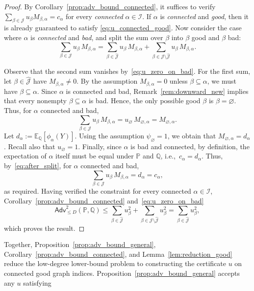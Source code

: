 \documentclass[11pt, letterpaper]{article}
\numberwithin{equation}{section}
\newcommand{\Adv}{\mathsf{Adv}}
\newcommand{\cJ}{\mathcal{J}}
\newcommand{\E}{\mathbb{E}}
\newcommand{\PP}{\mathbb{P}}
\newcommand{\QQ}{\mathbb{Q}}
\newcommand{\goodJ}{\widehat{\mathcal{J}}}
\begin{document}
\begin{proof}
By Corollary~\ref{prop:adv_bound_connected}, it suffices to verify
$\sum_{\beta\in\mathcal J} u_\beta M_{\beta,\alpha} = c_\alpha$ for every
\emph{connected} $\alpha\in\mathcal I$. If $\alpha$ is \emph{connected} and \emph{good}, then it is already guaranteed to satisfy \eqref{eq:u_connected_good}. Now consider the case where $\alpha$ is \emph{connected} and \emph{bad}, and split the sum over $\beta$ into  $\beta$ good and $\beta$ bad:
\begin{equation}\label{eq:case2_split}
\sum_{\beta \in \mathcal J} u_\beta\, M_{\beta,\alpha}
=\sum_{\beta \in \goodJ} u_\beta\, M_{\beta,\alpha}
+\sum_{\beta \in \mathcal J \setminus \goodJ} u_\beta\, M_{\beta,\alpha}.
\end{equation}

Observe that the second sum vanishes by~\eqref{eq:u_zero_on_bad}. For the first sum, let $\beta\in\widehat{\mathcal J}$ have $M_{\beta,\alpha}\neq0$. By the assumption $M_{\beta,\alpha}=0$ unless $\beta\subseteq\alpha$, we must have $\beta\subseteq\alpha$. Since $\alpha$ is connected and bad, Remark~\ref{rem:downward_new} implies that every nonempty $\beta\subseteq\alpha$ is bad. Hence, the only possible good $\beta$ is $\beta=\varnothing$. Thus, for $\alpha$ connected and bad,
\begin{equation}\label{eq:after_split}
\sum_{\beta \in \mathcal J} u_\beta\, M_{\beta,\alpha}
= u_\varnothing\, M_{\varnothing,\alpha}= M_{\varnothing,\alpha}.
\end{equation}
Let $d_\alpha:=\E_\QQ[\phi_\alpha(Y)]$. Using the assumption $\psi_\varnothing = 1$, we obtain that $M_{\varnothing,\alpha} = d_\alpha$. Recall also that $u_\varnothing = 1$. Finally, since $\alpha$ is bad and connected, by definition, the expectation of $\alpha$ itself must be equal under $\PP$ and $\QQ$, i.e.,\ $c_\alpha = d_\alpha$. Thus, by~\eqref{eq:after_split}, for $\alpha$ connected and bad,
\[
\sum_{\beta \in \mathcal J} u_\beta\, M_{\beta,\alpha}
=d_\alpha
=c_\alpha,
\]
as required. Having verified the constraint for every connected $\alpha\in\mathcal I$,
Corollary~\ref{prop:adv_bound_connected} and~\eqref{eq:u_zero_on_bad} 
\[
\Adv_{\le D}^2(\PP,\QQ)\le \sum_{\beta\in\goodJ}u_\beta^2+\sum_{\beta\in\cJ\setminus\goodJ}u_\beta^2= \sum_{\beta\in\goodJ}u_\beta^2,
\]
which proves the result.
\end{proof}
Together, Proposition~\ref{prop:adv_bound_general},
Corollary~\ref{prop:adv_bound_connected}, and
Lemma~\ref{lem:reduction_good} reduce the low-degree lower-bound problem to constructing the certificate $u$ on connected good graph indices. Proposition~\ref{prop:adv_bound_general} accepts any $u$ satisfying
\end{document}
